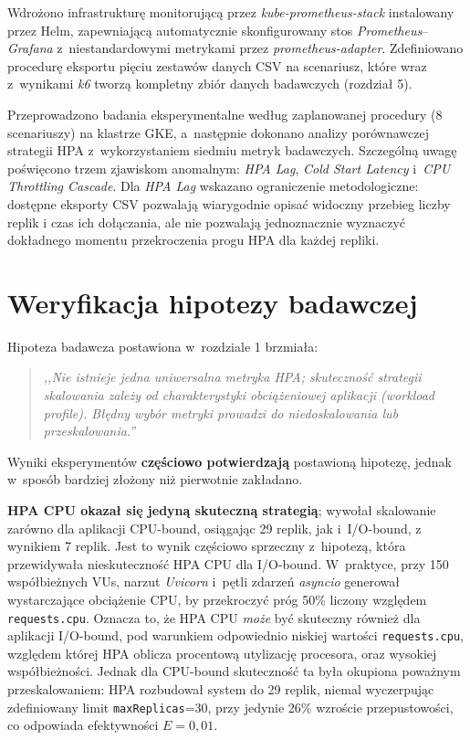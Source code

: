 Wdrożono infrastrukturę monitorującą przez \textit{kube-prometheus-stack} instalowany przez Helm, zapewniającą automatycznie skonfigurowany stos \textit{Prometheus}--\textit{Grafana} z~niestandardowymi metrykami przez \textit{prometheus-adapter}. Zdefiniowano procedurę eksportu pięciu zestawów danych CSV na scenariusz, które wraz z~wynikami \textit{k6} tworzą kompletny zbiór danych badawczych (rozdział 5).

Przeprowadzono badania eksperymentalne według zaplanowanej procedury (8 scenariuszy) na klastrze GKE, a~następnie dokonano analizy porównawczej strategii HPA z~wykorzystaniem siedmiu metryk badawczych. Szczególną uwagę poświęcono trzem zjawiskom anomalnym: \textit{HPA Lag}, \textit{Cold Start Latency} i~\textit{CPU Throttling Cascade}. Dla \textit{HPA Lag} wskazano ograniczenie metodologiczne: dostępne eksporty CSV pozwalają wiarygodnie opisać widoczny przebieg liczby replik i czas ich dołączania, ale nie pozwalają jednoznacznie wyznaczyć dokładnego momentu przekroczenia progu HPA dla każdej repliki.

\section{Weryfikacja hipotezy badawczej}

Hipoteza badawcza postawiona w~rozdziale 1 brzmiała:

\begin{quote}
\textit{,,Nie istnieje jedna uniwersalna metryka HPA; skuteczność strategii skalowania zależy od charakterystyki obciążeniowej aplikacji (\textit{workload profile}). Błędny wybór metryki prowadzi do niedoskalowania lub przeskalowania.''}
\end{quote}

Wyniki eksperymentów \textbf{częściowo potwierdzają} postawioną hipotezę, jednak w~sposób bardziej złożony niż pierwotnie zakładano.

\textbf{HPA CPU okazał się jedyną skuteczną strategią}; wywołał skalowanie zarówno dla aplikacji CPU-bound, osiągając 29 replik, jak i~I/O-bound, z wynikiem 7 replik. Jest to wynik częściowo sprzeczny z~hipotezą, która przewidywała nieskuteczność HPA CPU dla I/O-bound. W~praktyce, przy 150 współbieżnych VUs, narzut \textit{Uvicorn} i~pętli zdarzeń \textit{asyncio} generował wystarczające obciążenie CPU, by przekroczyć próg 50\% liczony względem \texttt{requests.cpu}. Oznacza to, że HPA CPU \textit{może} być skuteczny również dla aplikacji I/O-bound, pod warunkiem odpowiednio niskiej wartości \texttt{requests.cpu}, względem której HPA oblicza procentową utylizację procesora, oraz wysokiej współbieżności. Jednak dla CPU-bound skuteczność ta była okupiona poważnym przeskalowaniem: HPA rozbudował system do 29 replik, niemal wyczerpując zdefiniowany limit \texttt{maxReplicas}=30, przy jedynie 26\% wzroście przepustowości, co odpowiada efektywności $E = 0{,}01$.

